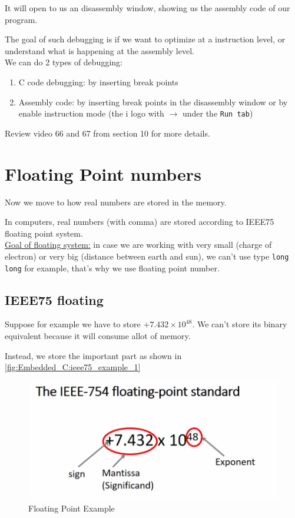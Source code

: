 It will open to us an disassembly window, showing us the assembly code of our program.

The goal of such debugging is if we want to optimize at a instruction level, or understand what is happening at the assembly level.\\

We can do 2 types of debugging:

\begin{enumerate}
    \item C code debugging: by inserting break points
    
    \item Assembly code: by inserting break points in the disassembly window or by enable instruction mode (the i logo with $\rightarrow$ under the \verb|Run tab|)
\end{enumerate}

Review video 66 and 67 from section 10 for more details. 

\newpage
\section{Floating Point numbers}

Now we move to how real numbers are stored in the memory.

In computers, real numbers (with comma) are stored according to IEEE75 floating point system.\\

\underline{Goal of floating system:} in case we are working with very small (charge of electron) or very big (distance between earth and sun), we can't use type \verb|long long| for example, that's why we use floating point number.

\subsection{IEEE75 floating}

Suppose for example we have to store $+ 7.432 \times 10^{48}$. We can't store its binary equivalent because it will consume allot of memory.

Instead, we store the important part as shown in \autoref{fig:Embedded_C:ieee75_example_1}


\begin{figure}[h]
\centering
\includegraphics[scale=0.5]{Figures/Embedded_C/ieee75_example_1}
\caption{Floating Point Example}
\label{fig:Embedded_C:ieee75_example_1}
\end{figure} 

